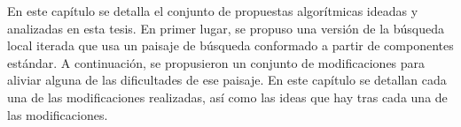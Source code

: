 En este capítulo se detalla el conjunto de propuestas algorítmicas ideadas y analizadas en esta tesis.
%
En primer lugar, se propuso una versión de la búsqueda local iterada que usa un paisaje de búsqueda conformado a partir de
componentes estándar.
%
A continuación, se propusieron un conjunto de modificaciones para aliviar alguna de las dificultades de ese paisaje.
%
En este capítulo se detallan cada una de las modificaciones realizadas, así como las ideas que hay tras cada una de las modificaciones.

